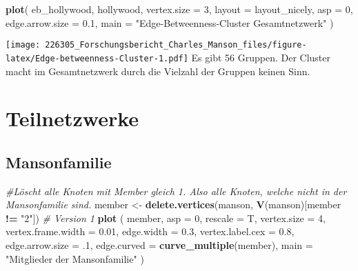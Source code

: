 \documentclass[
]{article}
\newenvironment{Shaded}{\begin{snugshade}}{\end{snugshade}}
\newcommand{\CommentTok}[1]{\textcolor[rgb]{0.56,0.35,0.01}{\textit{#1}}}
\newcommand{\DataTypeTok}[1]{\textcolor[rgb]{0.13,0.29,0.53}{#1}}
\newcommand{\DecValTok}[1]{\textcolor[rgb]{0.00,0.00,0.81}{#1}}
\newcommand{\FloatTok}[1]{\textcolor[rgb]{0.00,0.00,0.81}{#1}}
\newcommand{\KeywordTok}[1]{\textcolor[rgb]{0.13,0.29,0.53}{\textbf{#1}}}
\newcommand{\NormalTok}[1]{#1}
\newcommand{\OperatorTok}[1]{\textcolor[rgb]{0.81,0.36,0.00}{\textbf{#1}}}
\newcommand{\StringTok}[1]{\textcolor[rgb]{0.31,0.60,0.02}{#1}}
\begin{document}
\begin{Shaded}
\begin{Highlighting}[]
\KeywordTok{plot}\NormalTok{(}
\NormalTok{  eb_hollywood,}
\NormalTok{  hollywood,}
  \DataTypeTok{vertex.size =} \DecValTok{3}\NormalTok{,}
  \DataTypeTok{layout =}\NormalTok{ layout_nicely,}
  \DataTypeTok{asp =} \DecValTok{0}\NormalTok{,}
  \DataTypeTok{edge.arrow.size =} \FloatTok{0.1}\NormalTok{,}
  \DataTypeTok{main =} \StringTok{"Edge-Betweenness-Cluster Gesamtnetzwerk"}
\NormalTok{)}
\end{Highlighting}
\end{Shaded}

\texttt{[image: 226305\_Forschungsbericht\_Charles\_Manson\_files/figure-latex/Edge-betweenness-Cluster-1.pdf]}
Es gibt 56 Gruppen. Der Cluster macht im Gesamtnetzwerk durch die
Vielzahl der Gruppen keinen Sinn.

\hypertarget{teilnetzwerke}{%
\section{Teilnetzwerke}\label{teilnetzwerke}}

\hypertarget{mansonfamilie}{%
\subsection{Mansonfamilie}\label{mansonfamilie}}

\begin{Shaded}
\begin{Highlighting}[]
\CommentTok{#Löscht alle Knoten mit Member gleich 1. Also alle Knoten, welche nicht in der Mansonfamilie sind.}
\NormalTok{member <-}\StringTok{ }\KeywordTok{delete.vertices}\NormalTok{(manson, }\KeywordTok{V}\NormalTok{(manson)[member }\OperatorTok{!=}\StringTok{ "2"}\NormalTok{])}
\CommentTok{# Version 1}
\KeywordTok{plot}\NormalTok{ (}
\NormalTok{  member,}
  \DataTypeTok{asp =} \DecValTok{0}\NormalTok{,}
  \DataTypeTok{rescale =}\NormalTok{ T,}
  \DataTypeTok{vertex.size =} \DecValTok{4}\NormalTok{,}
  \DataTypeTok{vertex.frame.width =} \FloatTok{0.01}\NormalTok{,}
  \DataTypeTok{edge.width =} \FloatTok{0.3}\NormalTok{,}
  \DataTypeTok{vertex.label.cex =} \FloatTok{0.8}\NormalTok{,}
  \DataTypeTok{edge.arrow.size =} \FloatTok{.1}\NormalTok{,}
  \DataTypeTok{edge.curved =} \KeywordTok{curve_multiple}\NormalTok{(member),}
  \DataTypeTok{main =} \StringTok{"Mitglieder der Mansonfamilie"}
\NormalTok{)}
\end{Highlighting}
\end{Shaded}
\end{document}
